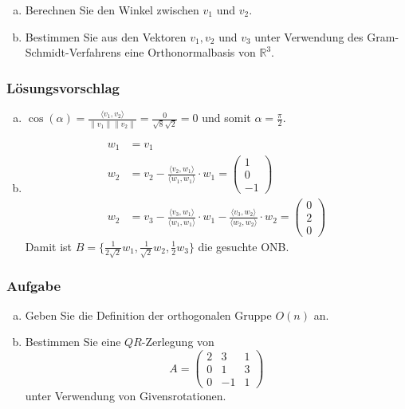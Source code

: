 \documentclass[a4paper,11pt]{scrartcl}
\newcounter{auf}
\newcommand{\Aufgabe}%
        {\addtocounter{auf}{1} \subsubsection*{\rmfamily  Aufgabe \theauf \hspace{1em}} }
\newcommand{\RR}{\mathbb{R}}
\begin{document}
\begin{enumerate}[a)]

\item Berechnen Sie den Winkel zwischen $v_1$ und $v_2$.
\item Bestimmen Sie aus den Vektoren $v_1,v_2$ und $v_3$ unter Verwendung des Gram-Schmidt-Verfahrens eine Orthonormalbasis von $\RR^3$.

\end{enumerate}
%
%
\subsubsection*{Lösungsvorschlag}
\begin{enumerate}[a)]
\item  $\cos(\alpha)=\frac{\langle v_1,v_2\rangle}{\|v_1\|\|v_2\|}=\frac{0}{\sqrt{8}\sqrt{2}}=0$ und somit $\alpha=\frac{\pi}{2}$.
\item
\begin{align*}
w_1&=v_1\\
w_2&=v_2-\frac{\langle v_2,w_1 \rangle}{\langle w_1,w_1\rangle}\cdot w_1=\begin{pmatrix} 1\\0\\-1\end{pmatrix}\\
w_2&=v_3-\frac{\langle v_3,w_1 \rangle}{\langle w_1,w_1\rangle}\cdot w_1-\frac{\langle v_3,w_2 \rangle}{\langle w_2,w_2\rangle}\cdot w_2=\begin{pmatrix} 0\\2\\0\end{pmatrix}
\end{align*}
Damit ist $B=\{\frac{1}{2\sqrt{2}}w_1,\frac{1}{\sqrt{2}}w_2,\frac{1}{2}w_3\}$ die gesuchte ONB.
\end{enumerate}


\newpage
\Aufgabe
\begin{enumerate}[a)]
\item Geben Sie die Definition der orthogonalen Gruppe $O(n)$ an.
\item Bestimmen Sie eine $QR$-Zerlegung von 
$$
A=\begin{pmatrix}2&3&1\\0&1&3\\0&-1&1 \end{pmatrix}
$$
unter Verwendung von Givensrotationen.
\end{enumerate}
%
%
\end{document}
